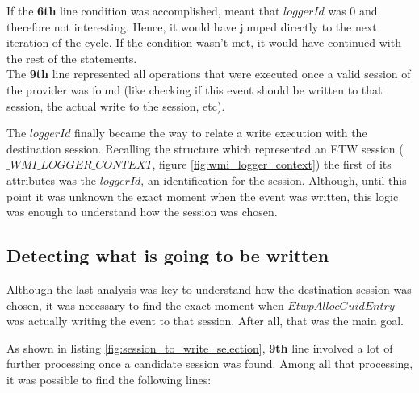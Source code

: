 If the {\bfseries 6th} line condition was accomplished, meant that $loggerId$ was 0 and therefore not interesting. Hence, it would have jumped directly to the next iteration of the cycle. If the condition wasn't met, it would have continued with the rest of the statements.\\
The {\bfseries 9th} line represented all operations that were executed once a valid session of the provider was found (like checking if this event should be written to that session, the actual write to the session, etc). 

The $loggerId$ finally became the way to relate a write execution with the destination session. Recalling the structure which represented an ETW session ($\_WMI\_LOGGER\_CONTEXT$, figure \ref{fig:wmi_logger_context}) the first of its attributes was the $loggerId$, an identification for the session. Although, until this point it was unknown the exact moment when the event was written, this logic was enough to understand how the session was chosen. 



\subsection{\bfseries Detecting what is going to be written}
Although the last analysis was key to understand how the destination session was chosen, it was necessary to find the exact moment when $EtwpAllocGuidEntry$ was actually writing the event to that session. After all, that was the main goal. 


As shown in listing \ref{fig:session_to_write_selection}, {\bfseries 9th} line involved a lot of further processing once a candidate session was found. Among all that processing, it was possible to find the following lines: 

